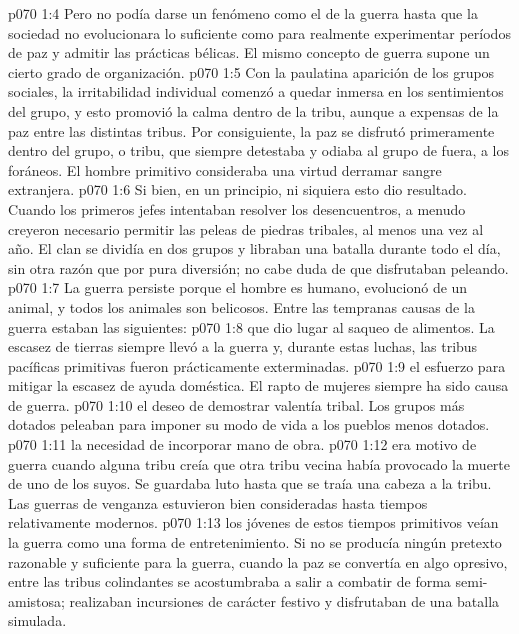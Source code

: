 \vs p070 1:4 Pero no podía darse un fenómeno como el de la guerra hasta que la sociedad no evolucionara lo suficiente como para realmente experimentar períodos de paz y admitir las prácticas bélicas. El mismo concepto de guerra supone un cierto grado de organización.
\vs p070 1:5 Con la paulatina aparición de los grupos sociales, la irritabilidad individual comenzó a quedar inmersa en los sentimientos del grupo, y esto promovió la calma dentro de la tribu, aunque a expensas de la paz entre las distintas tribus. Por consiguiente, la paz se disfrutó primeramente dentro del grupo, o tribu, que siempre detestaba y odiaba al grupo de fuera, a los foráneos. El hombre primitivo consideraba una virtud derramar sangre extranjera.
\vs p070 1:6 Si bien, en un principio, ni siquiera esto dio resultado. Cuando los primeros jefes intentaban resolver los desencuentros, a menudo creyeron necesario permitir las peleas de piedras tribales, al menos una vez al año. El clan se dividía en dos grupos y libraban una batalla durante todo el día, sin otra razón que por pura diversión; no cabe duda de que disfrutaban peleando.
\vs p070 1:7 \pc La guerra persiste porque el hombre es humano, evolucionó de un animal, y todos los animales son belicosos. Entre las tempranas causas de la guerra estaban las siguientes:
\vs p070 1:8  que dio lugar al saqueo de alimentos. La escasez de tierras siempre llevó a la guerra y, durante estas luchas, las tribus pacíficas primitivas fueron prácticamente exterminadas.
\vs p070 1:9  el esfuerzo para mitigar la escasez de ayuda doméstica. El rapto de mujeres siempre ha sido causa de guerra.
\vs p070 1:10  el deseo de demostrar valentía tribal. Los grupos más dotados peleaban para imponer su modo de vida a los pueblos menos dotados.
\vs p070 1:11  la necesidad de incorporar mano de obra.
\vs p070 1:12  era motivo de guerra cuando alguna tribu creía que otra tribu vecina había provocado la muerte de uno de los suyos. Se guardaba luto hasta que se traía una cabeza a la tribu. Las guerras de venganza estuvieron bien consideradas hasta tiempos relativamente modernos.
\vs p070 1:13  los jóvenes de estos tiempos primitivos veían la guerra como una forma de entretenimiento. Si no se producía ningún pretexto razonable y suficiente para la guerra, cuando la paz se convertía en algo opresivo, entre las tribus colindantes se acostumbraba a salir a combatir de forma semi\hyp{}amistosa; realizaban incursiones de carácter festivo y disfrutaban de una batalla simulada.
